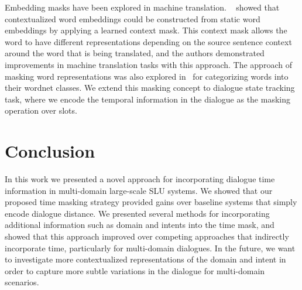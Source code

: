\documentclass[11pt,a4paper]{article}
\begin{document}
Embedding masks have been explored in machine translation.
~\cite{context-mask} showed that contextualized word embeddings could be constructed from static word embeddings by applying a learned context mask.
This context mask allows the word to have different representations depending on the source sentence context around the word that is being translated, and the authors demonstrated improvements in machine translation tasks with this approach.
The approach of masking word representations was also explored in~\cite{ruseti2016using} for categorizing words into their wordnet classes.
We extend this masking concept to dialogue state tracking task, where we encode the temporal information in the dialogue as the masking operation over slots.
 
\section{Conclusion}
In this work we presented a novel approach for incorporating dialogue time information in multi-domain large-scale SLU systems.
We showed that our proposed time masking strategy provided gains over baseline systems that simply encode dialogue distance.
We presented several methods for incorporating additional information such as domain and intents into the time mask, and showed that this approach improved over competing approaches that indirectly incorporate time, particularly for multi-domain dialogues.
In the future, we want to investigate more contextualized representations of the domain and intent in order to capture more subtle variations in the dialogue for multi-domain scenarios.
 




\end{document}
